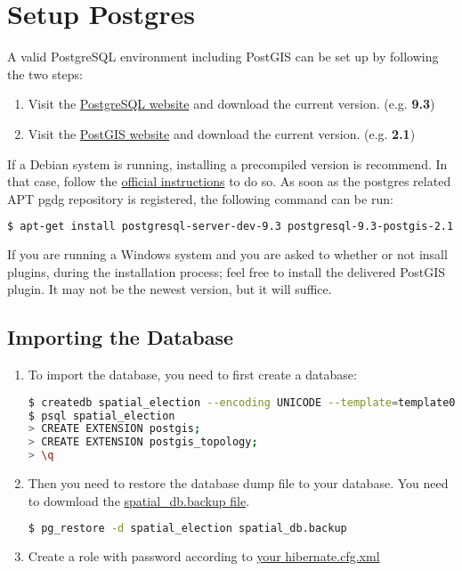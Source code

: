 
\section{Setup Postgres}

A valid PostgreSQL environment including PostGIS can be set up by
following the two steps:

\begin{enumerate}
\def\labelenumi{\arabic{enumi}.}
\item
  Visit the \href{http://www.postgresql.org/}{PostgreSQL website} and
  download the current version. (e.g. \textbf{9.3})
\item
  Visit the \href{http://postgis.net/}{PostGIS website} and download the
  current version. (e.g. \textbf{2.1})
\end{enumerate}

If a Debian system is running, installing a
precompiled version is recommend. In that case, follow the
\href{https://wiki.postgresql.org/wiki/Apt}{official instructions} to do
so. As soon as the postgres related APT pgdg repository is registered,
the following command can be run:

\begin{lstlisting}[numbers=none, language=bash]
$ apt-get install postgresql-server-dev-9.3 postgresql-9.3-postgis-2.1
\end{lstlisting}

If you are running a Windows system and you are asked to whether or not
insall plugins, during the installation process; feel free to install
the delivered PostGIS plugin. It may not be the newest version, but it
will suffice.

\subsection{Importing the Database}\label{importing-the-database}

\begin{enumerate}
\def\labelenumi{\arabic{enumi}.}
\item
  To import the database, you need to first create a database:

\begin{lstlisting}[numbers=none, language=bash]
$ createdb spatial_election --encoding UNICODE --template=template0
$ psql spatial_election
> CREATE EXTENSION postgis;
> CREATE EXTENSION postgis_topology;   
> \q
\end{lstlisting}
\item
  Then you need to restore the database dump file to your database. You
  need to dowmload the
  \href{https://github.com/a-d/spatial.election/raw/master/spatial.election.data/spatial_db.backup}{spatial\_db.backup
  file}.

\begin{lstlisting}[numbers=none, language=bash]
$ pg_restore -d spatial_election spatial_db.backup
\end{lstlisting}

\item
  Create a role with password according to
  \href{https://github.com/a-d/spatial.election/blob/master/spatial.election.database/src/main/resources/hibernate.cfg.xml}{your
  hibernate.cfg.xml}
\end{enumerate}